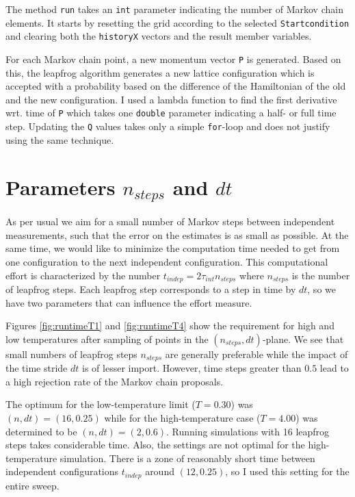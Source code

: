 The method \texttt{run} takes an \texttt{int} parameter indicating the number of Markov chain elements. It starts by resetting the grid according to the selected \texttt{Startcondition} and clearing both the \texttt{historyX} vectors and the result member variables.

For each Markov chain point, a new momentum vector \texttt{P} is generated. Based on this, the leapfrog algorithm generates a new lattice configuration which is accepted with a probability based on the difference of the Hamiltonian of the old and the new configuration. I used a lambda function to find the first derivative wrt. time of \texttt{P} which takes one \texttt{double} parameter indicating a half- or full time step. Updating the \texttt{Q} values takes only a simple \texttt{for}-loop and does not justify using the same technique.

\chapter{Parameters $n_{steps}$ and $dt$}
As per usual we aim for a small number of Markov steps between independent measurements, such that the error on the estimates is as small as possible. At the same time, we would like to minimize the computation time needed to get from one configuration to the next independent configuration. This computational effort is characterized by the number $t_{indep} = 2 \tau_{int} n_{steps}$ where $n_{steps}$ is the number of leapfrog steps. Each leapfrog step corresponds to a step in time by $dt$, so we have two parameters that can influence the effort measure.

Figures \ref{fig:runtimeT1} and \ref{fig:runtimeT4} show the requirement for high and low temperatures after sampling of points in the $(n_{steps}, dt)$-plane. We see that small numbers of leapfrog steps $n_{steps}$ are generally preferable while the impact of the time stride $dt$ is of lesser import. However, time steps greater than $0.5$ lead to a high rejection rate of the Markov chain proposals.

The optimum for the low-temperature limit ($T=0.30$) was $(n, dt) = (16, 0.25)$ while for the high-temperature case ($T=4.00$) was determined to be $(n, dt) = (2, 0.6)$. Running simulations with 16 leapfrog steps takes considerable time. Also, the settings are not optimal for the high-temperature simulation. There is a zone of reasonably short time between independent configurations $t_{indep}$ around $(12, 0.25)$, so I used this setting for the entire sweep.

